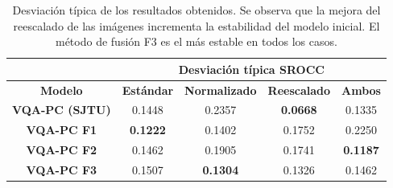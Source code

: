 \begin{table}[htp]
  \scriptsize
  \centering
\begin{tabular}{|c|cccc|}
\hline
\rowcolor[HTML]{FFC702}
                       & \multicolumn{4}{c|}{\textbf{Desviación típica SROCC}}                                                                                                \\ \hline
\rowcolor[HTML]{FFC702}
\textbf{Modelo}        & \multicolumn{1}{c|}{\textbf{Estándar}} & \multicolumn{1}{c|}{\textbf{Normalizado}} & \multicolumn{1}{c|}{\textbf{Reescalado}} & \textbf{Ambos}  \\ \hline
\textbf{VQA-PC (SJTU)} & \multicolumn{1}{c|}{0.1448}            & \multicolumn{1}{c|}{0.2357}               & \multicolumn{1}{c|}{\textbf{0.0668}}    & 0.1335          \\ \hline
\textbf{VQA-PC F1}     & \multicolumn{1}{c|}{\textbf{0.1222}}   & \multicolumn{1}{c|}{0.1402}               & \multicolumn{1}{c|}{0.1752}             & 0.2250          \\ \hline
\textbf{VQA-PC F2}     & \multicolumn{1}{c|}{0.1462}            & \multicolumn{1}{c|}{0.1905}               & \multicolumn{1}{c|}{0.1741}             & \textbf{0.1187} \\ \hline
\textbf{VQA-PC F3}     & \multicolumn{1}{c|}{0.1507}            & \multicolumn{1}{c|}{\textbf{0.1304}}      & \multicolumn{1}{c|}{0.1326}             & 0.1462          \\ \hline
\end{tabular}
\caption[Desviación típica de los resultados médicos.]{Desviación típica de los 
resultados obtenidos. Se observa que la mejora del reescalado de las imágenes 
incrementa la estabilidad del modelo inicial. El método de fusión F3 
es el más estable en todos los casos. }
\label{tab:STDevMed}
\end{table}

